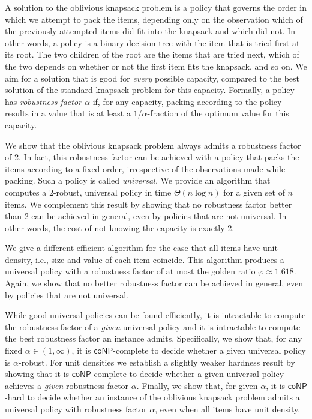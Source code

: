 \documentclass[11pt]{article}
\newcommand{\classcoNP}{\mathsf{coNP}}
\begin{document}
A solution to the oblivious knapsack problem is a policy that governs
the order in which we attempt to pack the items, depending only on
the observation which of the previously attempted items did fit into
the knapsack and which did not. In other words, a policy is a binary
decision tree with the item that is tried first at its root. The two
children of the root are the items that are tried next, which of the
two depends on whether or not the first item fits the knapsack, and
so on. We aim for a solution that is good for \emph{every} possible
capacity, compared to the best solution of the standard knapsack problem
for this capacity. Formally, a policy has \emph{robustness factor
$\alpha$ }if, for any capacity, packing according to the policy results
in a value that is at least a $1/\alpha$-fraction of the optimum
value for this capacity.

We show that the oblivious knapsack problem always admits a robustness
factor of 2. In fact, this robustness factor can be achieved with
a policy that packs the items according to a fixed order, irrespective
of the observations made while packing. Such a policy is called \emph{universal.
}We provide an algorithm that computes a 2-robust, universal policy
in time $\Theta(n\log n)$ for a given set of $n$ items. We complement
this result by showing that no robustness factor better than 2 can
be achieved in general, even by policies that are not universal. In
other words, the cost of not knowing the capacity is exactly 2.

We give a different efficient algorithm for the case that all items
have unit density, i.e., size and value of each item coincide. This
algorithm produces a universal policy with a robustness factor of
at most the golden ratio $\varphi\approx1.618$. Again, we show that
no better robustness factor can be achieved in general, even by policies
that are not universal. 

While good universal policies can be found efficiently, it is intractable
to compute the robustness factor of a \emph{given} universal policy
and it is intractable to compute the best robustness factor an instance
admits. Specifically, we show that, for any\emph{ }fixed\emph{ }$\alpha\in(1,\infty)$,
it is $\classcoNP$-complete to decide whether a given universal policy
is $\alpha$-robust. For unit densities we establish a slightly weaker
hardness result by showing that it is $\classcoNP$-complete to decide
whether a given universal policy achieves a \emph{given} robustness
factor $\alpha$. Finally, we show that, for given $\alpha$, it is
$\classcoNP$-hard to decide whether an instance of the oblivious
knapsack problem admits a universal policy with robustness factor
$\alpha$, even when all items have unit density.
\end{document}
